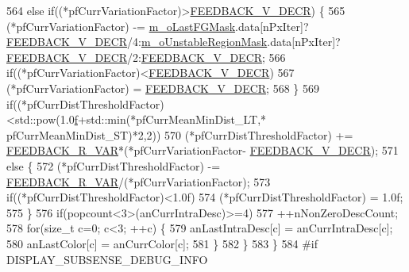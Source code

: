 \begin{DoxyCode}
564             \textcolor{keywordflow}{else} \textcolor{keywordflow}{if}((*pfCurrVariationFactor)>\mbox{\hyperlink{_background_subtractor_su_b_s_e_n_s_e_8cpp_a9acb8c94db1a579c5404b3f03fe986b5}{FEEDBACK\_V\_DECR}}) \{
565                 (*pfCurrVariationFactor) -= \mbox{\hyperlink{class_background_subtractor_l_b_s_p_adb6dc0af596c5592c91f9d8faa5c8a4b}{m\_oLastFGMask}}.data[nPxIter]?
      \mbox{\hyperlink{_background_subtractor_su_b_s_e_n_s_e_8cpp_a9acb8c94db1a579c5404b3f03fe986b5}{FEEDBACK\_V\_DECR}}/4:\mbox{\hyperlink{class_background_subtractor_su_b_s_e_n_s_e_acfaf4c3c5aedbed8bd302444b4a4f8dd}{m\_oUnstableRegionMask}}.data[nPxIter]?
      \mbox{\hyperlink{_background_subtractor_su_b_s_e_n_s_e_8cpp_a9acb8c94db1a579c5404b3f03fe986b5}{FEEDBACK\_V\_DECR}}/2:\mbox{\hyperlink{_background_subtractor_su_b_s_e_n_s_e_8cpp_a9acb8c94db1a579c5404b3f03fe986b5}{FEEDBACK\_V\_DECR}};
566                 \textcolor{keywordflow}{if}((*pfCurrVariationFactor)<\mbox{\hyperlink{_background_subtractor_su_b_s_e_n_s_e_8cpp_a9acb8c94db1a579c5404b3f03fe986b5}{FEEDBACK\_V\_DECR}})
567                     (*pfCurrVariationFactor) = \mbox{\hyperlink{_background_subtractor_su_b_s_e_n_s_e_8cpp_a9acb8c94db1a579c5404b3f03fe986b5}{FEEDBACK\_V\_DECR}};
568             \}
569             \textcolor{keywordflow}{if}((*pfCurrDistThresholdFactor)<std::pow(1.0\mbox{\hyperlink{rings_8cpp_a77369fc4d5326a16d2c603e032023528}{f}}+std::min(*pfCurrMeanMinDist\_LT,*
      pfCurrMeanMinDist\_ST)*2,2))
570                 (*pfCurrDistThresholdFactor) += \mbox{\hyperlink{_background_subtractor_su_b_s_e_n_s_e_8cpp_a4c9d9560115af87b00cdd28d4dee178a}{FEEDBACK\_R\_VAR}}*(*pfCurrVariationFactor-
      \mbox{\hyperlink{_background_subtractor_su_b_s_e_n_s_e_8cpp_a9acb8c94db1a579c5404b3f03fe986b5}{FEEDBACK\_V\_DECR}});
571             \textcolor{keywordflow}{else} \{
572                 (*pfCurrDistThresholdFactor) -= \mbox{\hyperlink{_background_subtractor_su_b_s_e_n_s_e_8cpp_a4c9d9560115af87b00cdd28d4dee178a}{FEEDBACK\_R\_VAR}}/(*pfCurrVariationFactor);
573                 \textcolor{keywordflow}{if}((*pfCurrDistThresholdFactor)<1.0f)
574                     (*pfCurrDistThresholdFactor) = 1.0f;
575             \}
576             \textcolor{keywordflow}{if}(popcount<3>(anCurrIntraDesc)>=4)
577                 ++nNonZeroDescCount;
578             \textcolor{keywordflow}{for}(\textcolor{keywordtype}{size\_t} c=0; c<3; ++c) \{
579                 anLastIntraDesc[c] = anCurrIntraDesc[c];
580                 anLastColor[c] = anCurrColor[c];
581             \}
582         \}
583     \}
584 \textcolor{preprocessor}{#if DISPLAY\_SUBSENSE\_DEBUG\_INFO}

\end{DoxyCode}
